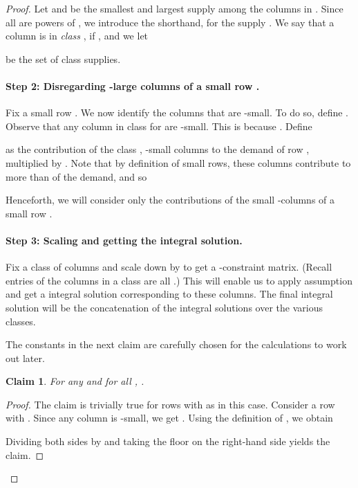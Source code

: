\documentclass[11pt]{article}
\newlength{\parcor}
\newtheorem{claim}{Claim}
\newcommand{\1}{\mathbb{1}}
\begin{document}
\begin{proof}
{Let  and  be the smallest and largest supply among 
the columns in . Since all  are powers of , we introduce the shorthand,  for the supply .
We say that a column  is in {\em class} ,
if , and we let 

be the set of class  supplies.  \\

\vspace*{\parcor}
\paragraph{Step 2: Disregarding -large columns of a small row .}

Fix a small row . We now identify the columns  that are -small.
To do so, define . Observe that any column  in class  
for  are -small. This is because .
Define 

as the contribution of the class , -small columns to the demand of row , multiplied by .
Note that by definition of small rows, these columns contribute to more than  of the demand, and so

Henceforth, we will consider only the contributions of the small -columns of a small row .\\

\vspace*{\parcor}
\paragraph{Step 3: Scaling and getting the integral solution.}

Fix a class  of columns and scale down by  to get a -constraint matrix.
(Recall entries of the columns in a class  are all .)
This will enable us to apply assumption  and get a integral solution corresponding to these columns.
The final integral solution will be the concatenation of the integral solutions over the various classes.

The constants in the next claim are carefully chosen for the calculations to work out later.

\begin{claim} \label{claim:s1}
  For any  and for all , . 
\end{claim}
\begin{proof}
  The claim is trivially true for rows  with  as  in this
  case. Consider a row  with .
  Since any column  is -small, we get . 
  Using the definition of , we
  obtain
  
  Dividing both sides by  and taking the floor on the right-hand side yields the claim.
\end{proof}

}
\end{proof}
\end{document}
